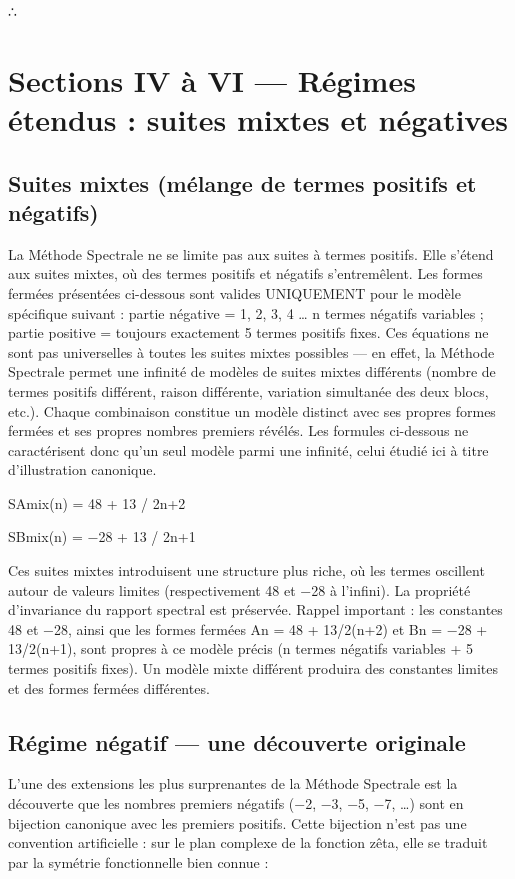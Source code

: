 \documentclass[11pt,a4paper]{article}
\begin{document}
∴

\section{Sections IV à VI — Régimes étendus : suites mixtes et négatives}
\subsection{Suites mixtes (mélange de termes positifs et négatifs)}

La Méthode Spectrale ne se limite pas aux suites à termes positifs. Elle s'étend aux suites mixtes, où des termes positifs et négatifs s'entremêlent. Les formes fermées présentées ci-dessous sont valides UNIQUEMENT pour le modèle spécifique suivant : partie négative = 1, 2, 3, 4 … n termes négatifs variables ; partie positive = toujours exactement 5 termes positifs fixes. Ces équations ne sont pas universelles à toutes les suites mixtes possibles — en effet, la Méthode Spectrale permet une infinité de modèles de suites mixtes différents (nombre de termes positifs différent, raison différente, variation simultanée des deux blocs, etc.). Chaque combinaison constitue un modèle distinct avec ses propres formes fermées et ses propres nombres premiers révélés. Les formules ci-dessous ne caractérisent donc qu'un seul modèle parmi une infinité, celui étudié ici à titre d'illustration canonique.

SAmix(n) = 48 + 13 / 2n+2

SBmix(n) = −28 + 13 / 2n+1

Ces suites mixtes introduisent une structure plus riche, où les termes oscillent autour de valeurs limites (respectivement 48 et −28 à l'infini). La propriété d'invariance du rapport spectral est préservée. Rappel important : les constantes 48 et −28, ainsi que les formes fermées An = 48 + 13/2(n+2) et Bn = −28 + 13/2(n+1), sont propres à ce modèle précis (n termes négatifs variables + 5 termes positifs fixes). Un modèle mixte différent produira des constantes limites et des formes fermées différentes.

\subsection{Régime négatif — une découverte originale}

L'une des extensions les plus surprenantes de la Méthode Spectrale est la découverte que les nombres premiers négatifs (−2, −3, −5, −7, …) sont en bijection canonique avec les premiers positifs. Cette bijection n'est pas une convention artificielle : sur le plan complexe de la fonction zêta, elle se traduit par la symétrie fonctionnelle bien connue :
\end{document}
